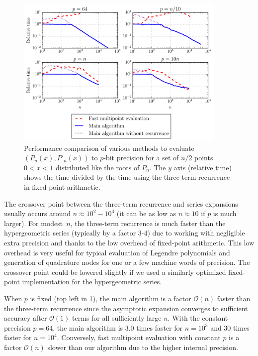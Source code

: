 \documentclass[nohypdvips,review]{siamart0216}
\newcommand{\OO}{\mathcal{O}}
\begin{document}
\begin{figure}
\begin{centering}
\includegraphics[width=0.9\textwidth]{benchplot}
\caption{Performance comparison of various methods to evaluate $(P_n(x), P'_n(x))$ to $p$-bit precision for a
set of $n / 2$ points $0 < x < 1$ distributed like the roots of $P_n$.
The $y$ axis (relative time) shows the time divided by the time
using the three-term recurrence in fixed-point arithmetic.}
\label{fig:benchplot}
\end{centering}
\end{figure}

The crossover point between the
three-term recurrence and series expansions usually occurs
around $n \approx 10^2 - 10^3$ (it can be as low as $n \approx 10$
if $p$ is much larger).
For modest $n$,
the three-term recurrence is much faster
than the hypergeometric series (typically by a factor 3-4)
due to working with negligible extra precision
and thanks to the low overhead of fixed-point arithmetic.
This low overhead is very useful for typical evaluation of
Legendre polynomials and generation of quadrature nodes
for one or a few machine words of precision.
The crossover point could be lowered slightly
if we used a similarly optimized fixed-point implementation
for the hypergeometric series.

When $p$ is fixed (top left in \cref{fig:benchplot}), the main algorithm is
a factor $\OO(n)$ faster
than the three-term recurrence
since the asymptotic expansion converges to sufficient accuracy after
$\OO(1)$ terms for all sufficiently large $n$.
With the constant precision $p = 64$,
the main algorithm is 3.0
times faster for $n = 10^3$ and 30 times faster for $n = 10^4$.
Conversely, fast multipoint evaluation
with constant $p$ is a factor $\OO(n)$ slower than our
algorithm due to the higher internal precision.
\end{document}
